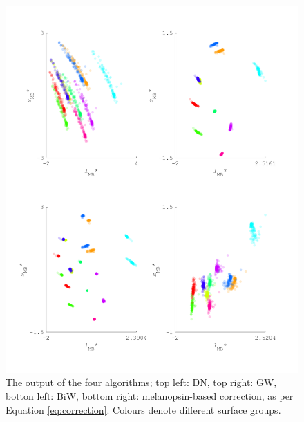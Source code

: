 \begin{figure}[htbp]
 \centerline{\includegraphics[max width=1.2\textwidth]{figs/comp/comparisonFourAlgos/output100.pdf}}
 \caption{The output of the four algorithms; top left: \gls{DN}, top right: \gls{GW}, botton left: \gls{BiW}, bottom right: melanopsin-based correction, as per Equation \ref{eq:correction}. Colours denote different surface groups.}
 \label{fig:output100}
\end{figure} 

